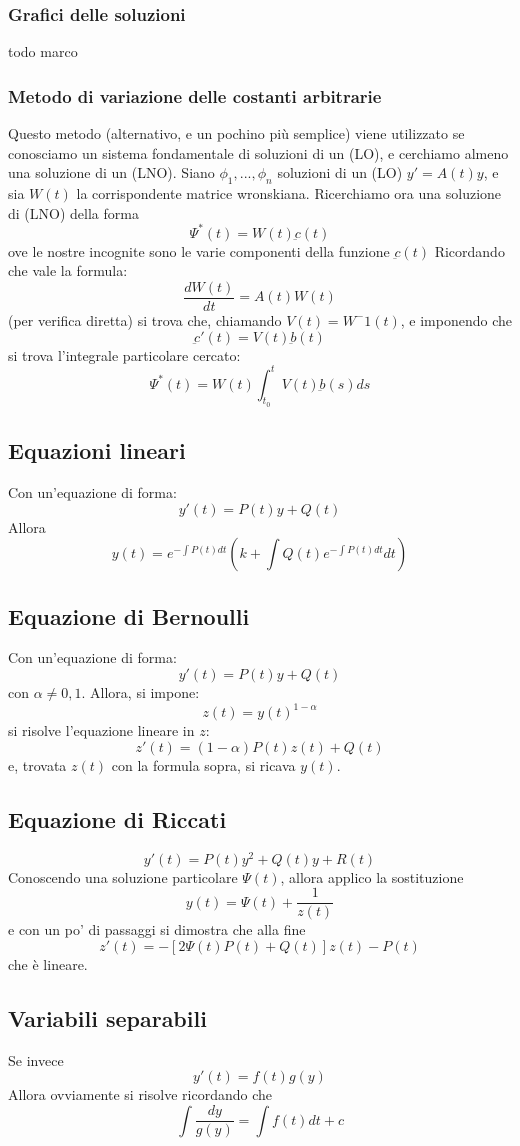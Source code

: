 \documentclass[a4paper,12pt]{article}
\begin{document}
\subsubsection{Grafici delle soluzioni}
todo marco
\subsubsection{Metodo di variazione delle costanti arbitrarie}
Questo metodo (alternativo, e un pochino più semplice) viene utilizzato se conosciamo un sistema fondamentale di soluzioni di un (LO), e cerchiamo almeno una soluzione di un (LNO).
Siano $\phi_1,...,\phi_n$ soluzioni di un (LO) $y'= A(t)y$, e sia $W(t)$ la corrispondente matrice wronskiana.
Ricerchiamo ora una soluzione di (LNO) della forma
$$\Psi^*(t)=W(t)\underbar{c}(t)$$
ove le nostre incognite sono le varie componenti della funzione $\underbar{c}(t)$
Ricordando che vale la formula:
$$\frac{dW(t)}{dt} = A(t)W(t)$$
(per verifica diretta) si trova che, chiamando $V(t) = W^-1(t)$, e imponendo che $$\underbar{c}'(t) = V(t)\underbar{b}(t)$$
si trova l'integrale particolare cercato:
$$\Psi^*(t)= W(t)\int_{t_0}^t V(t)\underbar{b}(s) ds$$

\subsection{Equazioni lineari}
Con un'equazione di forma:
$$y'(t) = P(t)y+Q(t)$$
Allora
$$y(t)=e^{- \displaystyle\int P(t)dt}\left(k + \int Q(t)e^{-\displaystyle\int P(t)dt}dt\right)$$
\subsection{Equazione di Bernoulli}
Con un'equazione di forma:
$$y'(t) = P(t)y+Q(t)$$
con $\alpha \neq 0, 1$. Allora, si impone:
$$ z(t)=y(t)^{1-\alpha} $$
si risolve l'equazione lineare in $z$: $$z'(t)=(1-\alpha)P(t)z(t)+Q(t)$$ e, trovata $z(t)$ con la formula sopra, si ricava $y(t)$.

\subsection{Equazione di Riccati}
$$y'(t) = P(t)y^2+Q(t)y+R(t)$$
Conoscendo una soluzione particolare $\Psi(t)$, allora applico la sostituzione
$$y(t)=\Psi(t)+\dfrac{1}{z(t)}$$
e con un po' di passaggi si dimostra che alla fine
$$z'(t)= -\left[2\Psi(t)P(t)+Q(t)\right]z(t)-P(t)$$
che è lineare.
\subsection{Variabili separabili}
Se invece
$$y'(t) = f(t)g(y)$$
Allora ovviamente si risolve ricordando che
$$\int\dfrac{dy}{g(y)}=\int f(t)dt + c$$
\end{document}

